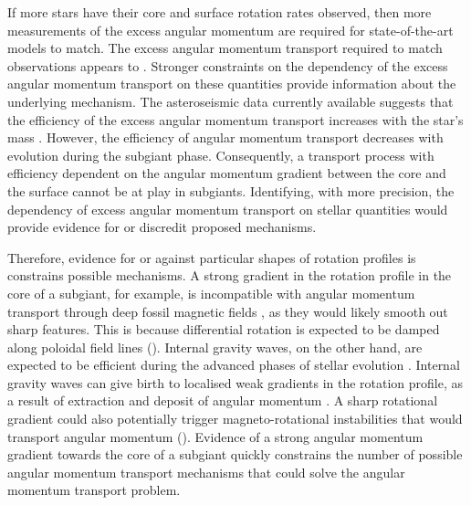 If more stars have their core and surface rotation rates observed, then more measurements of the excess angular momentum are required for state-of-the-art models to match.
The excess angular momentum transport required to match observations appears to .
Stronger constraints on the dependency of the excess angular momentum transport on these quantities provide information about the underlying mechanism.
The \kepler{} asteroseismic data currently available suggests that the efficiency of the excess angular momentum transport increases with the star's mass \citep{eggenberger_asteroseismology_2019}.
However, the efficiency of angular momentum transport decreases with evolution during the subgiant phase.
Consequently, a transport process with efficiency dependent on the angular momentum gradient between the core and the surface cannot be at play in subgiants.
Identifying, with more precision, the dependency of excess angular momentum transport on stellar quantities would provide evidence for or discredit proposed mechanisms.

Therefore, evidence for or against particular shapes of rotation profiles is constrains possible mechanisms.
A strong gradient in the rotation profile in the core of a subgiant, for example, is incompatible with angular momentum transport through deep fossil magnetic fields \citep{gough_effect_1990}, as they would likely smooth out sharp features.
 This is because differential rotation is expected to be damped along poloidal field lines (\citealp{garaud_rotationally_2002, strugarek_magnetic_2011}).
 Internal gravity waves, on the other hand, are expected to be efficient during the advanced phases of stellar evolution \citep{charbonnel_deep_2008}. 
Internal gravity waves can give birth to localised weak gradients in the rotation profile, as a result of extraction and deposit of angular momentum \citep{charbonnel_influence_2005}. 
A sharp rotational gradient could also potentially trigger magneto-rotational instabilities that would transport angular momentum (\citealp{balbus_stability_1994,arlt_differential_2003,menou_magnetorotational_2006, fuller_asteroseismology_2015, fuller_slowing_2019,moyano_asteroseismology_2022}). 
Evidence of a strong angular momentum gradient towards the core of a subgiant quickly constrains the number of possible angular momentum transport mechanisms that could solve the angular momentum transport problem.

